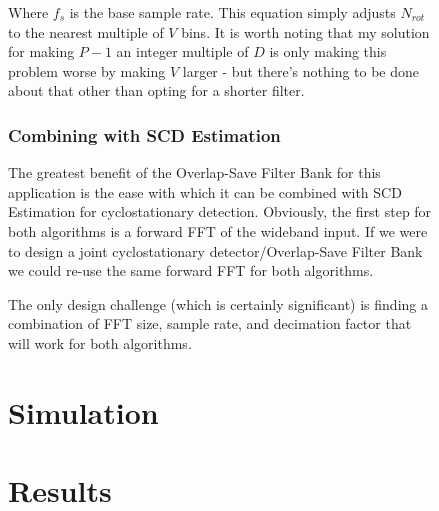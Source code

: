 \documentclass[12pt]{report}
\begin{document}
\begin{figure}[h!]
Where $f_s$ is the base sample rate. This equation simply adjusts $N_{rot}$ to
the nearest multiple of $V$ bins. It is worth noting that my solution for
making $P-1$ an integer multiple of $D$ is only making this problem worse by
making $V$ larger - but there's nothing to be done about that other than opting
for a shorter filter.

\subsection{Combining with SCD Estimation}
\label{sec:os_scd_estimation}

The greatest benefit of the Overlap-Save Filter Bank for this application is
the ease with which it can be combined with SCD Estimation for cyclostationary
detection. Obviously, the first step for both algorithms is a forward FFT of the
wideband input. If we were to design a joint cyclostationary
detector/Overlap-Save Filter Bank we could re-use the same forward FFT for both
algorithms.

The only design challenge (which is certainly significant) is finding
a combination of FFT size, sample rate, and decimation factor that will work
for both algorithms.



\chapter{Simulation}
\label{sec:sim}

\chapter{Results}
\label{sec:results}

%
%


\end{figure}
\end{document}
